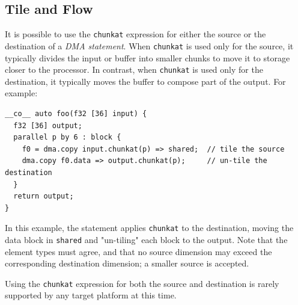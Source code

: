 \subsection*{Tile and Flow}

It is possible to use the \texttt{chunkat} expression for either the source or the destination of a \emph{DMA statement}. When \texttt{chunkat} is used only for the source, it typically divides the input or buffer into smaller chunks to move it to storage closer to the processor. In contrast, when \texttt{chunkat} is used only for the destination, it typically moves the buffer to compose part of the output. For example:

\begin{lstlisting}[language=croqtile,caption={Tile and Flow}]
__co__ auto foo(f32 [36] input) {
  f32 [36] output;
  parallel p by 6 : block {
    f0 = dma.copy input.chunkat(p) => shared;  // tile the source
    dma.copy f0.data => output.chunkat(p);     // un-tile the destination
  }
  return output;
}
\end{lstlisting}

In this example, the statement applies \texttt{chunkat} to the destination, moving the data block in \texttt{shared} and "un-tiling" each block to the output. Note that the element types must agree, and that no source dimension may exceed the corresponding destination dimension; a smaller source is accepted.

Using the \texttt{chunkat} expression for both the source and destination is rarely supported by any target platform at this time.
